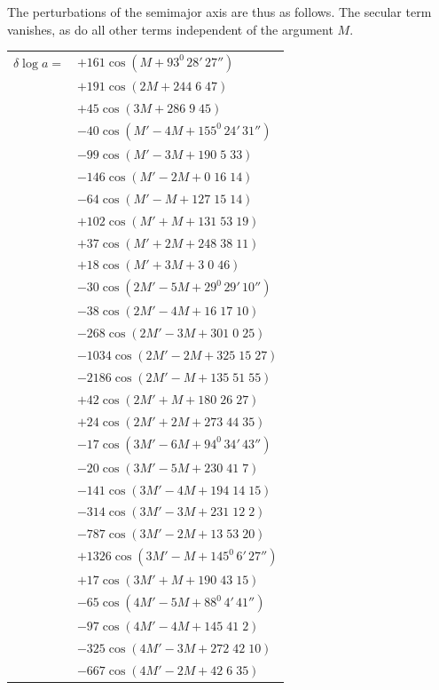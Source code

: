\begin{landscape}
\begin{center}
\begin{tabular}{@{}l@{\quad}l@{}}
\end{tabular}
\end{center}
\endgroup
\par\noindent\hspace*{\parindent}The perturbations of the semimajor axis are thus as follows. The secular term vanishes, as do all other terms independent of the argument \(M\).
\begingroup
\renewcommand{\arraystretch}{1.15}
\begin{longtable}{@{}r@{}l@{}}
\(\delta\log a={}\)&\(+161\cos(M+93^0\,28'\,27'')\)\\
&\(+191\cos(2M+244\;6\;47)\)\\
&\(+45\cos(3M+286\;9\;45)\)\\[3pt]
&\(-40\cos(M'-4M+155^0\,24'\,31'')\)\\
&\(-99\cos(M'-3M+190\;5\;33)\)\\
&\(-146\cos(M'-2M+0\;16\;14)\)\\
&\(-64\cos(M'-M+127\;15\;14)\)\\
&\(+102\cos(M'+M+131\;53\;19)\)\\
&\(+37\cos(M'+2M+248\;38\;11)\)\\
&\(+18\cos(M'+3M+3\;0\;46)\)\\[3pt]
&\(-30\cos(2M'-5M+29^0\,29'\,10'')\)\\
&\(-38\cos(2M'-4M+16\;17\;10)\)\\
&\(-268\cos(2M'-3M+301\;0\;25)\)\\
&\(-1034\cos(2M'-2M+325\;15\;27)\)\\
&\(-2186\cos(2M'-M+135\;51\;55)\)\\
&\(+42\cos(2M'+M+180\;26\;27)\)\\
&\(+24\cos(2M'+2M+273\;44\;35)\)\\[3pt]
&\(-17\cos(3M'-6M+94^0\,34'\,43'')\)\\
&\(-20\cos(3M'-5M+230\;41\;7)\)\\
&\(-141\cos(3M'-4M+194\;14\;15)\)\\
&\(-314\cos(3M'-3M+231\;12\;2)\)\\
&\(-787\cos(3M'-2M+13\;53\;20)\)\\
&\(+1326\cos(3M'-M+145^0\,6'\,27'')\)\\
&\(+17\cos(3M'+M+190\;43\;15)\)\\[3pt]
&\(-65\cos(4M'-5M+88^0\,4'\,41'')\)\\
&\(-97\cos(4M'-4M+145\;41\;2)\)\\
&\(-325\cos(4M'-3M+272\;42\;10)\)\\
&\(-667\cos(4M'-2M+42\;6\;35)\)\\

\end{longtable}
\end{landscape}
